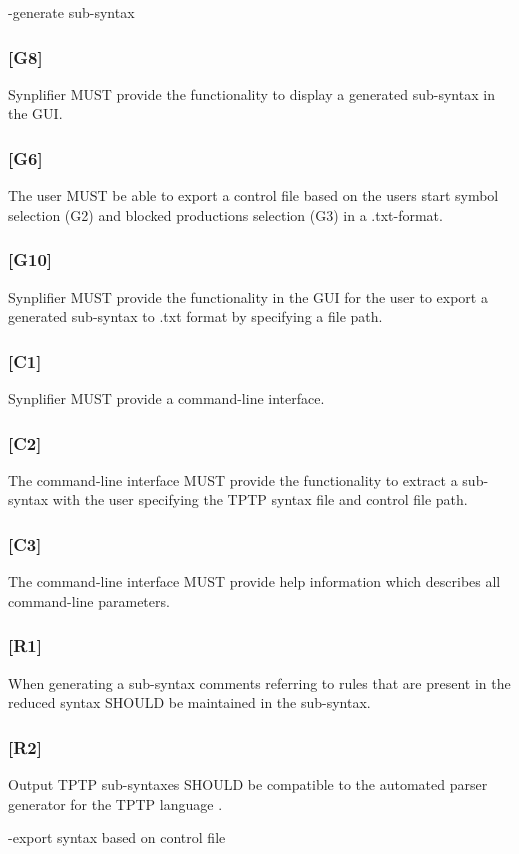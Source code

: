 -generate sub-syntax
\subsubsection{[G8]}\label{G8}
\ac{Synplifier} MUST provide the functionality to display a generated sub-syntax in the GUI.
\subsubsection{[G6]}\label{G6}
The user MUST be able to export a control file based on the users start symbol selection (G2) and blocked productions selection (G3) in a .txt-format.
\subsubsection{[G10]}\label{G10}
\ac{Synplifier} MUST provide the functionality in the GUI for the user to export a generated sub-syntax to .txt format by specifying a file path.
\subsubsection{[C1]}\label{C1}
\ac{Synplifier} MUST provide a command-line interface.
\subsubsection{[C2]}\label{C2}
The command-line interface MUST provide the functionality to extract a sub-syntax with the user specifying the \ac{TPTP} syntax file and control file path.
\subsubsection{[C3]}\label{C3}
The command-line interface MUST provide help information which describes all command-line parameters.
\subsubsection{[R1]}\label{R1}
When generating a sub-syntax comments referring to rules that are present in the reduced syntax SHOULD be maintained in the sub-syntax.
\subsubsection{[R2]}\label{R2}
Output \ac{TPTP} sub-syntaxes SHOULD be compatible to the automated parser generator for the \ac{TPTP} language \cite{VS06}.

-export syntax based on control file

